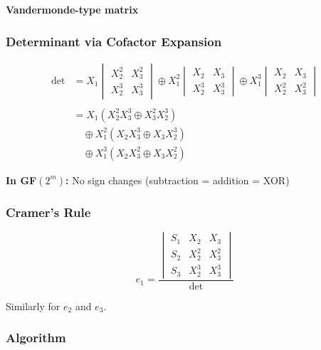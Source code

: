 \documentclass[11pt,a4paper]{article}
\begin{document}
\textbf{Vandermonde-type matrix}

\subsubsection{Determinant via Cofactor Expansion}

\begin{align}
\det &= X_1 \begin{vmatrix} X_2^2 & X_3^2 \\ X_2^3 & X_3^3 \end{vmatrix}
       \oplus X_1^2 \begin{vmatrix} X_2 & X_3 \\ X_2^3 & X_3^3 \end{vmatrix}
       \oplus X_1^3 \begin{vmatrix} X_2 & X_3 \\ X_2^2 & X_3^2 \end{vmatrix} \\
\\
&= X_1(X_2^2 X_3^3 \oplus X_3^2 X_2^3) \\
&\quad \oplus X_1^2(X_2 X_3^3 \oplus X_3 X_2^3) \\
&\quad \oplus X_1^3(X_2 X_3^2 \oplus X_3 X_2^2)
\end{align}

\textbf{In GF$(2^m)$:} No sign changes (subtraction = addition = XOR)

\subsubsection{Cramer's Rule}

\begin{equation}
e_1 = \frac{
\begin{vmatrix} S_1 & X_2 & X_3 \\ S_2 & X_2^2 & X_3^2 \\ S_3 & X_2^3 & X_3^3 \end{vmatrix}
}{\det}
\end{equation}

Similarly for $e_2$ and $e_3$.

\subsubsection{Algorithm}
\end{document}
